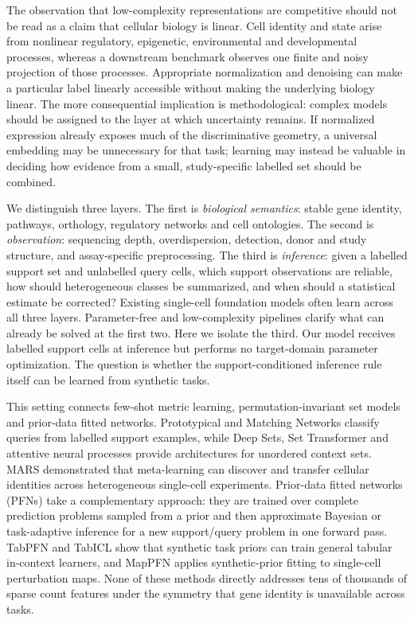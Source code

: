 \documentclass[12pt]{article}
\begin{document}
The observation that low-complexity representations are competitive should not be read as a claim that cellular biology is linear. Cell identity and state arise from nonlinear regulatory, epigenetic, environmental and developmental processes, whereas a downstream benchmark observes one finite and noisy projection of those processes. Appropriate normalization and denoising can make a particular label linearly accessible without making the underlying biology linear. The more consequential implication is methodological: complex models should be assigned to the layer at which uncertainty remains. If normalized expression already exposes much of the discriminative geometry, a universal embedding may be unnecessary for that task; learning may instead be valuable in deciding how evidence from a small, study-specific labelled set should be combined.

We distinguish three layers. The first is \emph{biological semantics}: stable gene identity, pathways, orthology, regulatory networks and cell ontologies. The second is \emph{observation}: sequencing depth, overdispersion, detection, donor and study structure, and assay-specific preprocessing. The third is \emph{inference}: given a labelled support set and unlabelled query cells, which support observations are reliable, how should heterogeneous classes be summarized, and when should a statistical estimate be corrected? Existing single-cell foundation models often learn across all three layers. Parameter-free and low-complexity pipelines clarify what can already be solved at the first two. Here we isolate the third. Our model receives labelled support cells at inference but performs no target-domain parameter optimization. The question is whether the support-conditioned inference rule itself can be learned from synthetic tasks.

This setting connects few-shot metric learning, permutation-invariant set models and prior-data fitted networks. Prototypical and Matching Networks classify queries from labelled support examples, while Deep Sets, Set Transformer and attentive neural processes provide architectures for unordered context sets\cite{snell2017prototypical,vinyals2016matching,zaheer2017deepsets,lee2019settransformer,kim2019anp}. MARS demonstrated that meta-learning can discover and transfer cellular identities across heterogeneous single-cell experiments\cite{brbic2020mars}. Prior-data fitted networks (PFNs) take a complementary approach: they are trained over complete prediction problems sampled from a prior and then approximate Bayesian or task-adaptive inference for a new support/query problem in one forward pass\cite{muller2022pfn,hollmann2025tabpfn}. TabPFN and TabICL show that synthetic task priors can train general tabular in-context learners, and MapPFN applies synthetic-prior fitting to single-cell perturbation maps\cite{hollmann2025tabpfn,qu2026tabiclv2,sextro2026mappfn}. None of these methods directly addresses tens of thousands of sparse count features under the symmetry that gene identity is unavailable across tasks.
\end{document}
